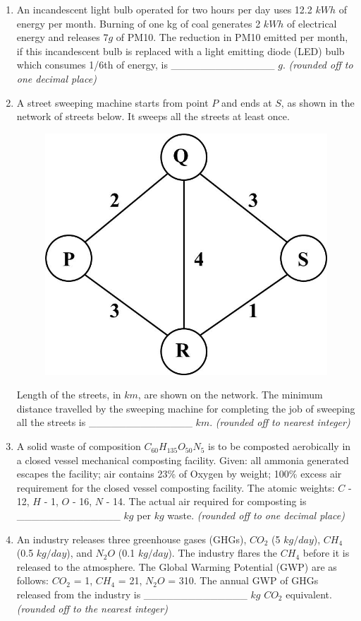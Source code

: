 \documentclass[journal]{IEEEtran}
\begin{document}
\begin{enumerate}[resume]
\item An incandescent light bulb operated for two hours per day uses 12.2 $kWh$ of energy per month. Burning of one kg of coal generates 2 $kWh$ of electrical energy and releases $7 g$ of PM10. The reduction in PM10 emitted per month, if this incandescent bulb is replaced with a light emitting diode (LED) bulb which consumes 1/6th of energy, is \_\_\_\_\_\_\_\_\_\_\_\_\_\_ $g$. \textit{(rounded off to one decimal place)} \hfill{}

\item A street sweeping machine starts from point $P$ and ends at $S$, as shown in the network of streets below. It sweeps all the streets at least once. \hfill{}
\begin{figure}[H]
    \centering
    \includegraphics[width=0.5\columnwidth]{figs/fig18.jpg}
\end{figure}
Length of the streets, in $km$, are shown on the network. The minimum distance travelled by the sweeping machine for completing the job of sweeping all the streets is \_\_\_\_\_\_\_\_\_\_\_\_\_\_ $km$. \textit{(rounded off to nearest integer)}

\item A solid waste of composition $C_{60}H_{135}O_{50}N_5$ is to be composted aerobically in a closed vessel mechanical composting facility. Given: all ammonia generated escapes the facility; air contains 23\% of Oxygen by weight; 100\% excess air requirement for the closed vessel composting facility. The atomic weights: $C$ - 12, $H$ - 1, $O$ - 16, $N$ - 14. The actual air required for composting is \_\_\_\_\_\_\_\_\_\_\_\_\_\_ $kg$ per $kg$ waste. \textit{(rounded off to one decimal place)} \hfill{}

\item An industry releases three greenhouse gases (GHGs), $CO_2$ (5 $kg/day$), $CH_4$ (0.5 $kg/day$), and $N_2O$ (0.1 $kg/day$). The industry flares the $CH_4$ before it is released to the atmosphere. The Global Warming Potential (GWP) are as follows: $CO_2$ = 1, $CH_4$ = 21, $N_2O$ = 310. The annual GWP of GHGs released from the industry is \_\_\_\_\_\_\_\_\_\_\_\_\_\_ $kg$ $CO_2$ equivalent. \textit{(rounded off to the nearest integer)} \hfill{}


\end{enumerate}
\end{document}
